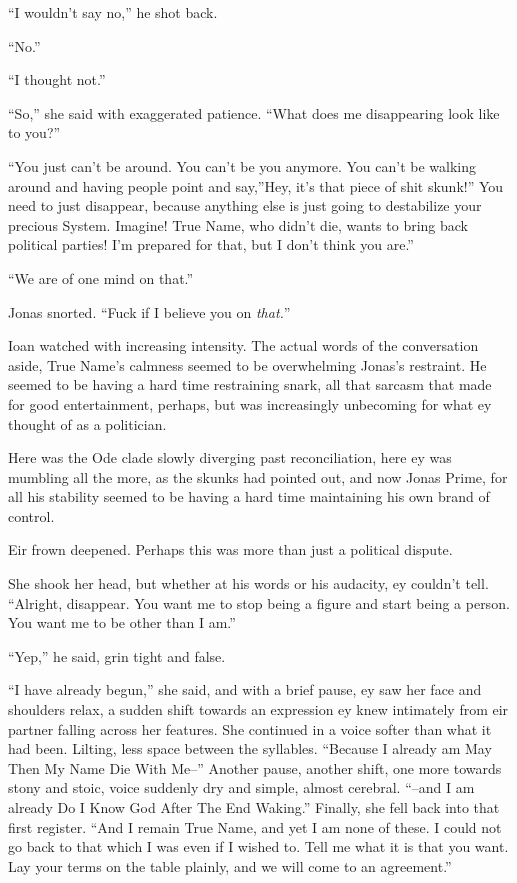 ``I wouldn't say no,'' he shot back.

``No.''

``I thought not.''

``So,'' she said with exaggerated patience. ``What does me disappearing look like to you?''

``You just can't be around. You can't be you anymore. You can't be walking around and having people point and say,''Hey, it's that piece of shit skunk!'' You need to just disappear, because anything else is just going to destabilize your precious System. Imagine! True Name, who didn't die, wants to bring back political parties! I'm prepared for that, but I don't think you are.''

``We are of one mind on that.''

Jonas snorted. ``Fuck if I believe you on \emph{that.}''

Ioan watched with increasing intensity. The actual words of the conversation aside, True Name's calmness seemed to be overwhelming Jonas's restraint. He seemed to be having a hard time restraining snark, all that sarcasm that made for good entertainment, perhaps, but was increasingly unbecoming for what ey thought of as a politician.

Here was the Ode clade slowly diverging past reconciliation, here ey was mumbling all the more, as the skunks had pointed out, and now Jonas Prime, for all his stability seemed to be having a hard time maintaining his own brand of control.

Eir frown deepened. Perhaps this was more than just a political dispute.

She shook her head, but whether at his words or his audacity, ey couldn't tell. ``Alright, disappear. You want me to stop being a figure and start being a person. You want me to be other than I am.''

``Yep,'' he said, grin tight and false.

``I have already begun,'' she said, and with a brief pause, ey saw her face and shoulders relax, a sudden shift towards an expression ey knew intimately from eir partner falling across her features. She continued in a voice softer than what it had been. Lilting, less space between the syllables. ``Because I already am May Then My Name Die With Me--'' Another pause, another shift, one more towards stony and stoic, voice suddenly dry and simple, almost cerebral. ``--and I am already Do I Know God After The End Waking.'' Finally, she fell back into that first register. ``And I remain True Name, and yet I am none of these. I could not go back to that which I was even if I wished to. Tell me what it is that you want. Lay your terms on the table plainly, and we will come to an agreement.''

